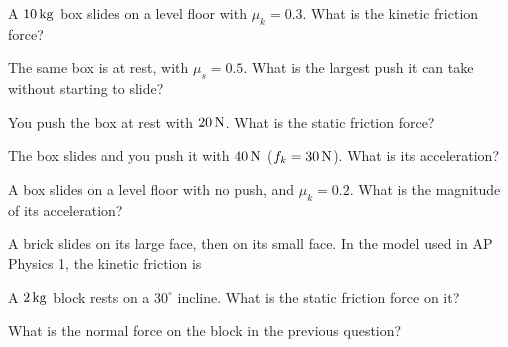 \begin{exo}{}
A $10\,\mathrm{kg}$ box slides on a level floor with $\mu_k=0.3$. What is the kinetic friction force?
\choices{$3\N$}{$30\N$}{$300\N$}{$0.3\N$}
\end{exo}
\begin{exo}{}
The same box is at rest, with $\mu_s=0.5$. What is the largest push it can take without starting to slide?
\choices{$50\N$}{$30\N$}{$100\N$}{$5\N$}
\end{exo}
\begin{exo}{}
You push the box at rest with $20\,\mathrm{N}$. What is the static friction force?
\end{exo}
\begin{exo}{}
The box slides and you push it with $40\,\mathrm{N}$ ($f_k=30\,\mathrm{N}$). What is its acceleration?
\choices{$4\mss$}{$1\mss$}{$7\mss$}{$3\mss$}
\end{exo}
\begin{exo}{}
A box slides on a level floor with no push, and $\mu_k=0.2$. What is the magnitude of its acceleration?
\choices{$0.2\mss$}{$20\mss$}{$2\mss$}{$10\mss$}
\end{exo}
\begin{exo}{}
A brick slides on its large face, then on its small face. In the model used in AP Physics 1, the kinetic friction is
\end{exo}
\begin{exo}{}
A $2\,\mathrm{kg}$ block rests on a $30^\circ$ incline. What is the static friction force on it?
\end{exo}
\begin{exo}{}
What is the normal force on the block in the previous question?
\end{exo}
